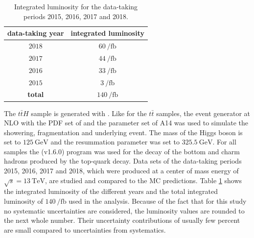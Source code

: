 %
\begin{table}[htbp]
		\centering
                \renewcommand{\arraystretch}{1.2}       
		\begin{tabular*}{\linewidth}{@{\extracolsep{\fill}}cc}
		\hline
		\hline
		\textbf{data-taking year}&  \textbf{integrated luminosity}
		\\
		\hline
                $2018$                & $\SI{60}{\per\femto\barn}$
                \\
                $2017$                & $\SI{44}{\per\femto\barn}$
                \\
                $2016$                & $\SI{33}{\per\femto\barn}$
                \\
                $2015$                & $\SI{3}{\per\femto\barn}$
                \\
                \hline
                \textbf{total}        & $\SI{140}{\per\femto\barn}$
                \\
		\hline
		\hline
		\end{tabular*}
		\caption[Integrated luminosity for the data-taking periods 2015-2018.]{Integrated luminosity for the data-taking periods 2015, 2016, 2017 and 2018.}
\label{datalumi}
\renewcommand{\arraystretch}{1}
\end{table}
%
The $t\bar{t}H$ sample is generated with {\POWHEG}. Like for the $t\bar{t}$ samples, the event generator {\Pythia} at NLO with the PDF set of {\NNPDFz} and the parameter set of A14 was used to simulate the showering, fragmentation and underlying event. The mass of the Higgs boson is set to $\SI{125}{\giga\electronvolt}$ and the resummation parameter was set to $\SI{325.5}{\giga\electronvolt}$. \newline
For all samples the {\EvtGen} (v1.6.0) \cite{EvtGen} program was used for the decay of the bottom and charm hadrons produced by the top-quark decay.\newline
Data sets of the data-taking periods 2015, 2016, 2017 and 2018, which were produced at a center of mass energy of $\sqrt{s}=\SI{13}{\tera\electronvolt}$, are studied and compared to the MC predictions. Table \ref{datalumi} shows the integrated luminosity of the different years and the total integrated luminosity of $\SI{140}{\per\femto\barn}$ used in the analysis. Because of the fact that for this study no systematic uncertainties are considered, the luminosity values are rounded to the next whole number. Their uncertainty contributions of usually few percent are small compared to uncertainties from systematics.
